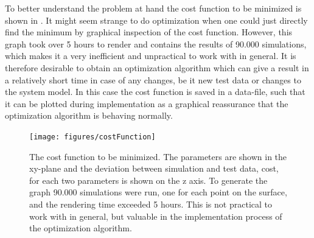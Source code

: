 To better understand the problem at hand the cost function to be minimized is shown in . It might seem strange to do optimization when one could just directly find the minimum by graphical inspection of the cost function. However, this graph took over 5 hours to render and contains the results of 90.000 simulations, which makes it a very inefficient and unpractical to work with in general. It is therefore desirable to obtain an optimization algorithm which can give a result in a relatively short time in case of any changes, be it new test data or changes to the system model. In this case the cost function is saved in a data-file, such that it can be plotted during implementation as a graphical reassurance that the optimization algorithm is behaving normally.

\begin{figure}[H]
	\centering
	\texttt{[image: figures/costFunction]}
	\caption{The cost function to be minimized. The parameters are shown in the xy-plane and the deviation between simulation and test data, cost, for each two parameters is shown on the z axis. To generate the graph 90.000 simulations were run, one for each point on the surface, and the rendering time exceeded 5 hours. This is not practical to work with in general, but valuable in the implementation process of the optimization algorithm.}
	\label{costFunction}
\end{figure}

